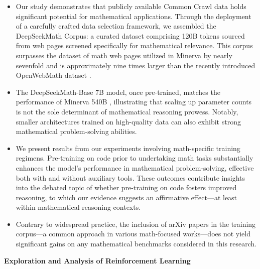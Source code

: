 \begin{itemize}[topsep=0pt]
    \item Our study demonstrates that publicly available Common Crawl data holds significant potential for mathematical applications. Through the deployment of a carefully crafted data selection framework, we assembled the DeepSeekMath Corpus: a curated dataset comprising 120B tokens sourced from web pages screened specifically for mathematical relevance. This corpus surpasses the dataset of math web pages utilized in Minerva \citep{minerva} by nearly sevenfold and is approximately nine times larger than the recently introduced OpenWebMath dataset \citep{openwebmath}.

    \item The DeepSeekMath-Base 7B model, once pre-trained, matches the performance of Minerva 540B \citep{minerva}, illustrating that scaling up parameter counts is not the sole determinant of mathematical reasoning prowess. Notably, smaller architectures trained on high-quality data can also exhibit strong mathematical problem-solving abilities.

    \item We present results from our experiments involving math-specific training regimens. Pre-training on code prior to undertaking math tasks substantially enhances the model's performance in mathematical problem-solving, effective both with and without auxiliary tools. These outcomes contribute insights into the debated topic of whether pre-training on code fosters improved reasoning, to which our evidence suggests an affirmative effect—at least within mathematical reasoning contexts.

    \item Contrary to widespread practice, the inclusion of arXiv papers in the training corpus—a common approach in various math-focused works—does not yield significant gains on any mathematical benchmarks considered in this research.
\end{itemize}

\textbf{Exploration and Analysis of Reinforcement Learning}

